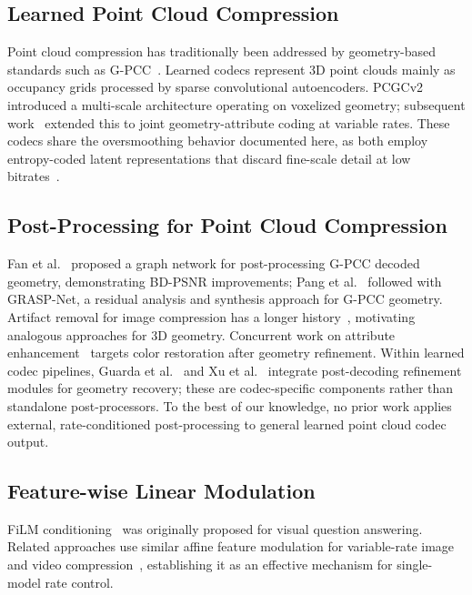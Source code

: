 \documentclass[conference]{IEEEtran}
\begin{document}
\subsection{Learned Point Cloud Compression}

Point cloud compression has traditionally been addressed by geometry-based
standards such as G-PCC~\cite{graziosi2020gpcc}. Learned codecs represent
3D point clouds mainly as occupancy grids processed by sparse convolutional
autoencoders. PCGCv2~\cite{wang2021multiscale,wang2023sparsepcgc}
introduced a multi-scale architecture operating on voxelized geometry;
subsequent work~\cite{wang2025unicorn} extended this to joint geometry-attribute
coding at variable rates. These codecs share the oversmoothing behavior
documented here, as both employ entropy-coded latent representations that
discard fine-scale detail at low bitrates~\cite{he2022density,wang2025unicorn}.

\subsection{Post-Processing for Point Cloud Compression}

Fan et al.~\cite{fan2022deep} proposed a graph network for post-processing
G-PCC decoded geometry, demonstrating BD-PSNR improvements; Pang et
al.~\cite{pang2022graspnet} followed with GRASP-Net, a residual analysis
and synthesis approach for G-PCC geometry. Artifact removal for image
compression has a longer history~\cite{dong2015compression}, motivating
analogous approaches for 3D geometry. Concurrent work on attribute
enhancement~\cite{ugae2025} targets color restoration after geometry
refinement. Within learned codec pipelines, Guarda et al.~\cite{guarda2025deep} and
Xu et al.~\cite{xu2024fast} integrate post-decoding refinement modules for
geometry recovery; these are codec-specific components rather than standalone
post-processors. To the best of our knowledge, no prior work applies external, rate-conditioned
post-processing to general learned point cloud codec output.

\subsection{Feature-wise Linear Modulation}

FiLM conditioning~\cite{perez2018film} was originally proposed for visual
question answering. Related approaches use similar affine feature modulation
for variable-rate image and video
compression~\cite{choi2019variable,cui2021asymmetric,song2021variable,li2024neural},
establishing it as an effective mechanism for single-model rate control.
\end{document}
